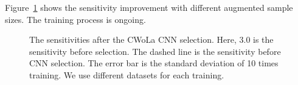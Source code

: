 \documentclass[12pt]{article}
\begin{document}
        Figure~\ref{fig:sensitivity_improvement_aug_SB_3_event_norm_dp_035} shows the sensitivity improvement with different augmented sample sizes. The training process is ongoing.
        \begin{figure}[htpb]
            \centering
            \caption{The sensitivities after the CWoLa CNN selection. Here, $3.0$ is the sensitivity before selection. The dashed line is the sensitivity before CNN selection. The error bar is the standard deviation of 10 times training. We use different datasets for each training.}
            \label{fig:sensitivity_improvement_aug_SB_3_event_norm_dp_035}
        \end{figure}



\end{document}
